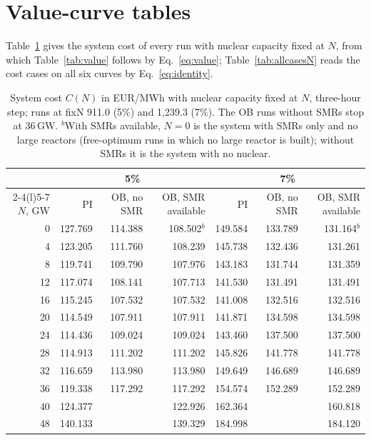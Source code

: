 \appendix
\renewcommand{\thetable}{\thesection\arabic{table}}
\section{Value-curve tables}\label{app:curves}
\setcounter{table}{0}
Table~\ref{tab:costN} gives the system cost of every run with nuclear capacity fixed at $N$, from which Table~\ref{tab:value} follows by Eq.~\eqref{eq:value}; Table~\ref{tab:allcasesN} reads the cost cases on all six curves by Eq.~\eqref{eq:identity}.

\begin{table}[H]
\centering\footnotesize
\caption{System cost $C(N)$ in EUR/MWh with nuclear capacity fixed at $N$, three-hour step; runs at fixN 911.0 (5\%) and 1{,}239.3 (7\%). The OB runs without SMRs stop at 36\,GW. $^{b}$With SMRs available, $N=0$ is the system with SMRs only and no large reactors (free-optimum runs in which no large reactor is built); without SMRs it is the system with no nuclear.}\label{tab:costN}
\begin{tabular}{@{}rrrrrrr@{}}
\toprule
 & \multicolumn{3}{c}{5\%} & \multicolumn{3}{c}{7\%}\\
\cmidrule(lr){2-4}\cmidrule(l){5-7}
$N$, GW & PI & OB, no SMR & OB, SMR available & PI & OB, no SMR & OB, SMR available\\
\midrule
0 & 127.769 & 114.388 & 108.502$^{b}$ & 149.584 & 133.789 & 131.164$^{b}$\\
4 & 123.205 & 111.760 & 108.239 & 145.738 & 132.436 & 131.261\\
8 & 119.741 & 109.790 & 107.976 & 143.183 & 131.744 & 131.359\\
12 & 117.074 & 108.141 & 107.713 & 141.530 & 131.491 & 131.491\\
16 & 115.245 & 107.532 & 107.532 & 141.008 & 132.516 & 132.516\\
20 & 114.549 & 107.911 & 107.911 & 141.871 & 134.598 & 134.598\\
24 & 114.436 & 109.024 & 109.024 & 143.460 & 137.500 & 137.500\\
28 & 114.913 & 111.202 & 111.202 & 145.826 & 141.778 & 141.778\\
32 & 116.659 & 113.980 & 113.980 & 149.649 & 146.689 & 146.689\\
36 & 119.338 & 117.292 & 117.292 & 154.574 & 152.289 & 152.289\\
40 & 124.377 & & 122.926 & 162.364 & & 160.818\\
48 & 140.133 & & 139.329 & 184.998 & & 184.120\\
\bottomrule
\end{tabular}
\end{table}

